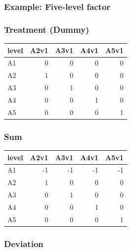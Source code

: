 \documentclass[]{book}
\begin{document}
\hypertarget{example-five-level-factor}{%
\subsubsection{Example: Five-level factor}\label{example-five-level-factor}}

\hypertarget{treatment-dummy-1}{%
\subsubsection{Treatment (Dummy)}\label{treatment-dummy-1}}

\begin{table}[H]
\centering
\begin{tabular}{l|r|r|r|r}
\hline
level & A2v1 & A3v1 & A4v1 & A5v1\\
\hline
A1 & 0 & 0 & 0 & 0\\
\hline
A2 & 1 & 0 & 0 & 0\\
\hline
A3 & 0 & 1 & 0 & 0\\
\hline
A4 & 0 & 0 & 1 & 0\\
\hline
A5 & 0 & 0 & 0 & 1\\
\hline
\end{tabular}
\end{table}

\hypertarget{sum-1}{%
\subsubsection{Sum}\label{sum-1}}

\begin{table}[H]
\centering
\begin{tabular}{l|r|r|r|r}
\hline
level & A2v1 & A3v1 & A4v1 & A5v1\\
\hline
A1 & -1 & -1 & -1 & -1\\
\hline
A2 & 1 & 0 & 0 & 0\\
\hline
A3 & 0 & 1 & 0 & 0\\
\hline
A4 & 0 & 0 & 1 & 0\\
\hline
A5 & 0 & 0 & 0 & 1\\
\hline
\end{tabular}
\end{table}

\hypertarget{deviation-1}{%
\subsubsection{Deviation}\label{deviation-1}}
\end{document}
